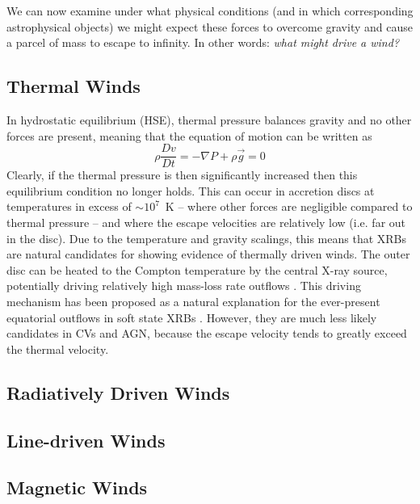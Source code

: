 We can now examine under what physical conditions 
(and in which corresponding astrophysical objects)
we might expect these forces to overcome gravity and 
cause a parcel of mass to escape to infinity.
In other words: {\em what might drive a wind?}

\subsection{Thermal Winds}

In hydrostatic equilibrium (HSE), thermal pressure balances gravity and no other forces 
are present, meaning that the equation of motion can be written as 
\begin{equation}
\label{eq:hse}
\rho \frac{Dv}{Dt} = -\nabla P +  \rho \vec{g} = 0
\end{equation}
Clearly, if the thermal pressure is then significantly 
increased then this equilibrium condition no longer holds. 
This can occur in accretion discs at temperatures in excess of $\sim10^7$~K --
where other forces are negligible compared to thermal pressure -- 
and where the escape velocities are relatively low (i.e. far out in the disc).
Due to the temperature and gravity scalings, this means
that XRBs are natural candidates for showing evidence of thermally driven
winds. The outer disc can be heated to the Compton temperature by the central X-ray source,
potentially driving relatively high mass-loss rate outflows \citep{begelman1983,woods1996}. 
This driving mechanism has been proposed as a natural explanation
for the ever-present equatorial outflows in soft state XRBs \citep{ponti2012}.
However, they are much less likely candidates in CVs and AGN, because
the escape velocity tends to greatly exceed the thermal velocity.

\subsection{Radiatively Driven Winds}
\label{sec:rad_winds}



\subsection{Line-driven Winds}

\subsection{Magnetic Winds}
\label{sec:magq_winds}

